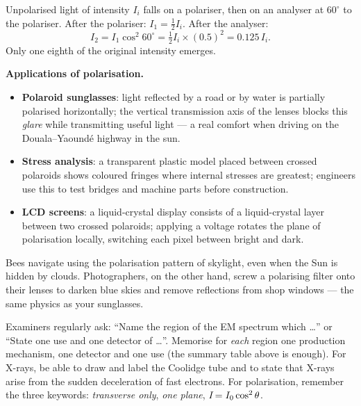 \documentclass[11pt]{article}
\begin{document}
\begin{exemplebox}
Unpolarised light of intensity $I_i$ falls on a polariser, then on an analyser at $60^{\circ}$ to the polariser. After the polariser: $I_1 = \tfrac{1}{2}I_i$. After the analyser:
\[ I_2 = I_1\cos^2 60^{\circ} = \tfrac{1}{2}I_i \times (0.5)^2 = 0.125\,I_i. \]
Only one eighth of the original intensity emerges.
\end{exemplebox}

\textbf{Applications of polarisation.}
\begin{itemize}
\item \textbf{Polaroid sunglasses}: light reflected by a road or by water is partially polarised horizontally; the vertical transmission axis of the lenses blocks this \emph{glare} while transmitting useful light — a real comfort when driving on the Douala--Yaound\'e highway in the sun.
\item \textbf{Stress analysis}: a transparent plastic model placed between crossed polaroids shows coloured fringes where internal stresses are greatest; engineers use this to test bridges and machine parts before construction.
\item \textbf{LCD screens}: a liquid-crystal display consists of a liquid-crystal layer between two crossed polaroids; applying a voltage rotates the plane of polarisation locally, switching each pixel between bright and dark.
\end{itemize}

\begin{savaistu}
Bees navigate using the polarisation pattern of skylight, even when the Sun is hidden by clouds. Photographers, on the other hand, screw a polarising filter onto their lenses to darken blue skies and remove reflections from shop windows — the same physics as your sunglasses.
\end{savaistu}

\begin{aretenir}
Examiners regularly ask: ``Name the region of the EM spectrum which \dots'' or ``State one use and one detector of \dots''. Memorise for \emph{each} region one production mechanism, one detector and one use (the summary table above is enough). For X-rays, be able to draw and label the Coolidge tube and to state that X-rays arise from the sudden deceleration of fast electrons. For polarisation, remember the three keywords: \emph{transverse only}, \emph{one plane}, $\emph{I} = I_0\cos^2\theta$.
\end{aretenir}
\end{document}
